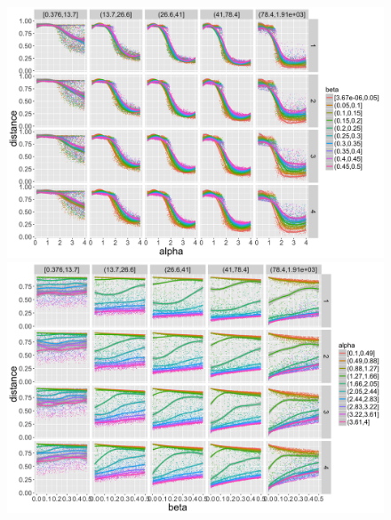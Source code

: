 \begin{figure}
\centering
\includegraphics[width=\textwidth]{figuresraw/distance_alpha}
\includegraphics[width=\textwidth]{figuresraw/distance_beta}
\caption{}
\label{}
\end{figure}

